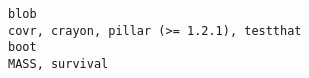 \documentclass[
  letterpaper,
  DIV=11,
  numbers=noendperiod]{scrreprt}
\begin{document}
\begin{verbatim}
blob                                                                                                                                                                                                                                                                                                                                                                                                                                                                                                                                                                                                                                                                                                                                                                                                                                                                                                                                                                                                                                                                                                                                                                                                                                                                covr, crayon, pillar (>= 1.2.1), testthat
boot                                                                                                                                                                                                                                                                                                                                                                                                                                                                                                                                                                                                                                                                                                                                                                                                                                                                                                                                                                                                                                                                                                                                                                                                                                                                                           MASS, survival

\end{verbatim}
\end{document}
